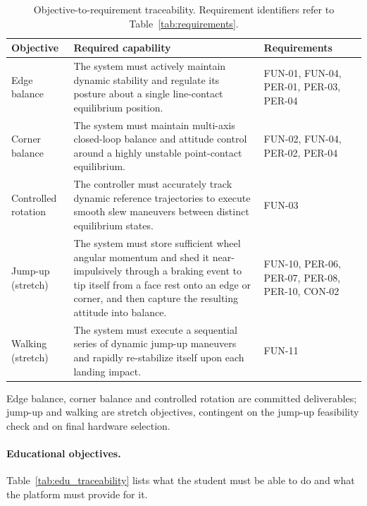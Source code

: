 \begin{table}[htbp]
\centering
\caption[Objective-to-requirement traceability]{Objective-to-requirement traceability. Requirement identifiers refer to
Table~\ref{tab:requirements}.}
\label{tab:traceability}
\small
\setlength{\tabcolsep}{4pt}
\begin{tabular}{@{} L{2.4cm} L{6.5cm} L{4.6cm} @{}}
\toprule
Objective & Required capability & Requirements \\
\midrule
Edge balance        & The system must actively maintain dynamic stability and regulate its posture about a single line-contact equilibrium position. & FUN-01, FUN-04, PER-01, PER-03, PER-04 \\[0.5em]
Corner balance      & The system must maintain multi-axis closed-loop balance and attitude control around a highly unstable point-contact equilibrium. & FUN-02, FUN-04, PER-02, PER-04 \\[0.5em]
Controlled rotation & The controller must accurately track dynamic reference trajectories to execute smooth slew maneuvers between distinct equilibrium states. & FUN-03 \\[0.5em]
Jump-up (stretch)   & The system must store sufficient wheel angular momentum and shed it near-impulsively through a braking event to tip itself from a face rest onto an edge or corner, and then capture the resulting attitude into balance. & FUN-10, PER-06, PER-07, PER-08, PER-10, CON-02 \\[0.5em]
Walking (stretch)   & The system must execute a sequential series of dynamic jump-up maneuvers and rapidly re-stabilize itself upon each landing impact. & FUN-11 \\
\bottomrule
\end{tabular}
\end{table}

Edge balance, corner balance and controlled rotation are committed deliverables;
jump-up and walking are stretch objectives, contingent on the jump-up
feasibility check and on final hardware selection.

\paragraph{Educational objectives.} Table~\ref{tab:edu_traceability} lists what
the student must be able to do and what the platform must provide for it.

